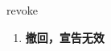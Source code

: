 
\begin{frame}
{\huge revoke}
\begin{center}
\begin{enumerate}\Large
  \item \textbf{撤回，宣告无效}
\end{enumerate}
\end{center}
\end{frame}
